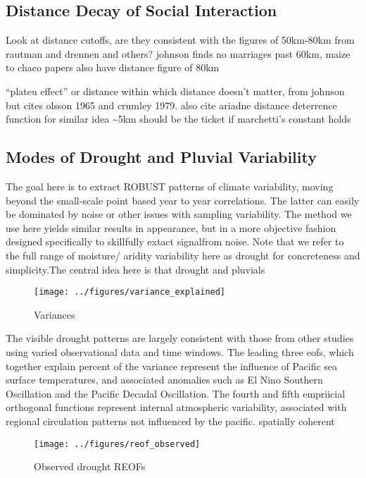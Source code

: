 \documentclass[10pt,letterpaper]{article}
\begin{document}
\subsection{Distance Decay of Social
Interaction}\label{distance-decay-of-social-interaction}

Look at distance cutoffs, are they consistent with the figures of
50km-80km from rautman and drennen and others? johnson finds no
marriages past 60km, maize to chaco papers also have distance figure of
80km

``plateu effect'' or distance within which distance doesn't matter, from
johnson but cites olsson 1965 and crumley 1979. also cite ariadne
distance deterrence function for similar idea \textasciitilde{}5km
should be the ticket if marchetti's constant holds

\subsection{Modes of Drought and Pluvial
Variability}\label{modes-of-drought-and-pluvial-variability}

The goal here is to extract ROBUST patterns of climate variability,
moving beyond the small-scale point based year to year correlations. The
latter can easily be dominated by noise or other issues with sampling
variability. The method we use here yields similar results in
appearance, but in a more objective fashion designed specifically to
skillfully extact signalfrom noise. Note that we refer to the full range
of moisture/ aridity variability here as drought for concreteness and
simplicity.The central idea here is that drought and pluvials

\begin{figure}
\texttt{[image: ../figures/variance\_explained]} \caption{Variances}\label{fig:unnamed-chunk-1}
\end{figure}

The visible drought patterns are largely consistent with those from
other studies using varied observational data and time windows. The
leading three eofs, which together explain percent of the variance
represent the influence of Pacific sea surface temperatures, and
associated anomalies such as El Nino Southern Oscillation and the
Pacific Decadal Oscillation. The fourth and fifth empriicial orthogonal
functions represent internal atmospheric variability, associated with
regional circulation patterns not influenced by the pacific. spatially
coherent

\begin{figure}
\texttt{[image: ../figures/reof\_observed]} \caption{Observed drought REOFs}\label{fig:unnamed-chunk-2}
\end{figure}
\end{document}
